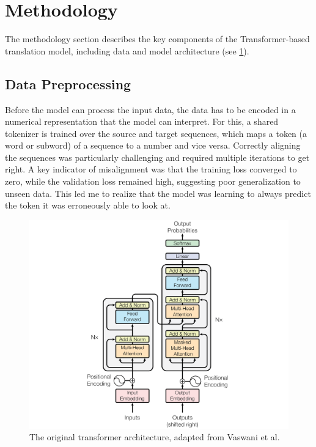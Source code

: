 \section{Methodology} 
The methodology section describes the key components of the Transformer-based translation model, including data and model architecture (see \cref{fig:transformer}).

\subsection{Data Preprocessing}
Before the model can process the input data, the data has to be encoded in a numerical representation that the model can interpret.
For this, a shared tokenizer is trained over the source and target sequences, which maps a token (a word or subword) of a sequence to a number and vice versa. 
Correctly aligning the sequences was particularly challenging and required multiple iterations to get right.
A key indicator of misalignment was that the training loss converged to zero, while the validation loss remained high, suggesting poor generalization to unseen data.
This led me to realize that the model was learning to always predict the token it was erroneously able to look at.

\begin{figure}[h]
    \begin{center}
        \includegraphics[width=\textwidth]{figures/transformer.png}
    \end{center}
    \caption{The original transformer architecture, adapted from Vaswani et al.~\cite{vaswani2017attention}}\label{fig:transformer}
\end{figure}

